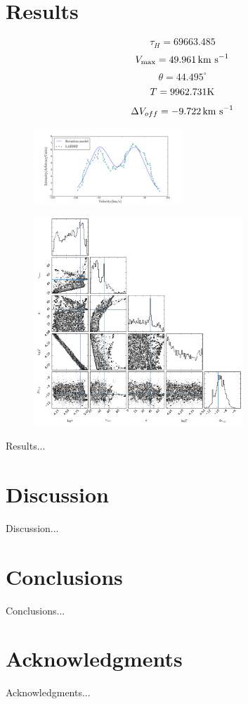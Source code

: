 \documentclass{emulateapj}
\newcommand{\kms}{{\ifmmode{{\mathrm{\,km\ s}^{-1}}}\else{\,km~s$^{-1}$}\fi}}
\begin{document}
\section{Results}
\label{sec:results}

$$\tau_{H} = 69663.485 $$
$$V_{\rm max} = 49.961\kms $$
$$\theta = 44.495^\circ $$
$$T = 9962.731 \rm K$$
$$\Delta V_{off} = -9.722 \kms$$

\begin{figure}
\begin{center}
  \includegraphics[width=0.5\textwidth]{mcmc.png}
\end{center}
\caption{
    \label{fig:mcmc_result}}  
\end{figure}

\begin{figure}
\begin{center}
  \includegraphics[width=0.7\textwidth]{parameters.png}
\end{center}
\caption{
    \label{fig:mcmc_triangle}}  
\end{figure}

Results...\\


\section{Discussion}
\label{sec:discussion}

Discussion...\\


\section{Conclusions}
\label{sec:conclusions}

Conclusions...\\


\section*{Acknowledgments}

Acknowledgments...\\





\end{document}
